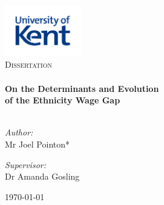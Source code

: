 \begin{titlepage}
\vbox{ }

\vbox{ }

\begin{center}
\includegraphics[width=0.25\textwidth]{./images/kent_logo.jpg}\\[1cm]
\textsc{\LARGE Dissertation}\\[1.5cm]

\vbox{ }
\HRule \\[0.4cm]
{ \huge \bfseries \linespread{1} On the Determinants and Evolution}\\[0.4cm]
{ \huge \bfseries \linespread{1} of the Ethnicity Wage Gap \vspace{-10pt}}\\[0.4cm]
\HRule \\[1.5cm]
\begin{minipage}{0.4\textwidth}
\begin{flushleft} \large
\emph{Author:}\\
Mr Joel Pointon*
\end{flushleft}
\end{minipage}
\begin{minipage}{0.4\textwidth}
\begin{flushright} \large
\emph{Supervisor:} \\
Dr Amanda Gosling
\end{flushright}
\end{minipage}
\vfill
{\large \today}

\end{center}
\end{titlepage}